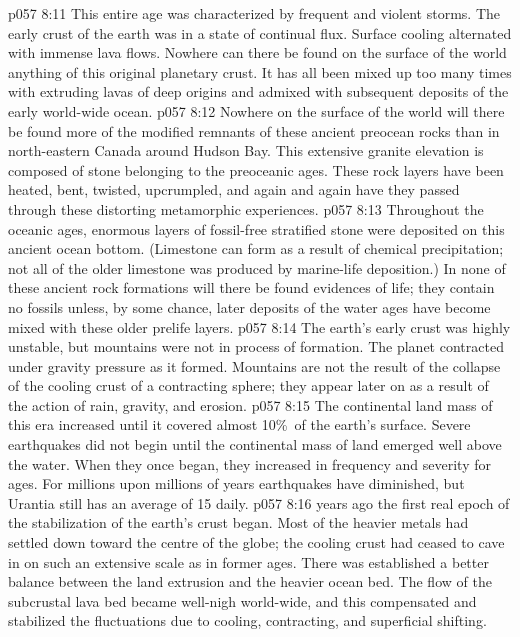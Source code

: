 \vs p057 8:11 \pc This entire age was characterized by frequent and violent storms. The early crust of the earth was in a state of continual flux. Surface cooling alternated with immense lava flows. Nowhere can there be found on the surface of the world anything of this original planetary crust. It has all been mixed up too many times with extruding lavas of deep origins and admixed with subsequent deposits of the early world\hyp{}wide ocean.
\vs p057 8:12 Nowhere on the surface of the world will there be found more of the modified remnants of these ancient preocean rocks than in north\hyp{}eastern Canada around Hudson Bay. This extensive granite elevation is composed of stone belonging to the preoceanic ages. These rock layers have been heated, bent, twisted, upcrumpled, and again and again have they passed through these distorting metamorphic experiences.
\vs p057 8:13 Throughout the oceanic ages, enormous layers of fossil\hyp{}free stratified stone were deposited on this ancient ocean bottom. (Limestone can form as a result of chemical precipitation; not all of the older limestone was produced by marine\hyp{}life deposition.) In none of these ancient rock formations will there be found evidences of life; they contain no fossils unless, by some chance, later deposits of the water ages have become mixed with these older prelife layers.
\vs p057 8:14 The earth’s early crust was highly unstable, but mountains were not in process of formation. The planet contracted under gravity pressure as it formed. Mountains are not the result of the collapse of the cooling crust of a contracting sphere; they appear later on as a result of the action of rain, gravity, and erosion.
\vs p057 8:15 The continental land mass of this era increased until it covered almost 10\%\ of the earth’s surface. Severe earthquakes did not begin until the continental mass of land emerged well above the water. When they once began, they increased in frequency and severity for ages. For millions upon millions of years earthquakes have diminished, but Urantia still has an average of 15 daily.
\vs p057 8:16 \pc {} years ago the first real epoch of the stabilization of the earth’s crust began. Most of the heavier metals had settled down toward the centre of the globe; the cooling crust had ceased to cave in on such an extensive scale as in former ages. There was established a better balance between the land extrusion and the heavier ocean bed. The flow of the subcrustal lava bed became well\hyp{}nigh world\hyp{}wide, and this compensated and stabilized the fluctuations due to cooling, contracting, and superficial shifting.
